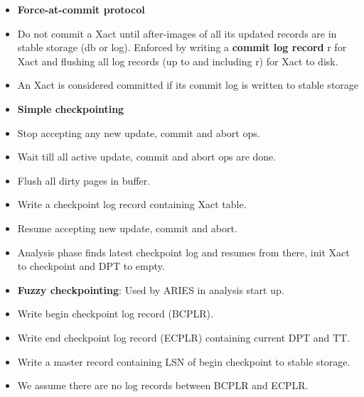\documentclass[8pt, landscape]{extarticle}
\begin{document}
\begin{multicols*}{4}
\begin{itemize}
  \item \textbf{Force-at-commit protocol}
  \item Do not commit a Xact until after-images of all its updated records are in stable storage (db or log). Enforced by writing a \textbf{commit log record} r for Xact and flushing all log records (up to and including r) for Xact to disk.
  \item An Xact is considered committed if its commit log is written to stable storage
  \item \textbf{Simple checkpointing}
  \item Stop accepting any new update, commit and abort ops.
  \item Wait till all active update, commit and abort ops are done.
  \item Flush all dirty pages in buffer.
  \item Write a checkpoint log record containing Xact table.
  \item Resume accepting new update, commit and abort.
  \item Analysis phase finds latest checkpoint log and resumes from there, init Xact to checkpoint and DPT to empty.
  \item \textbf{Fuzzy checkpointing}: Used by ARIES in analysis start up.
  \item Write begin checkpoint log record (BCPLR).
  \item Write end checkpoint log record (ECPLR) containing current DPT and TT.
  \item Write a master record containing LSN of begin checkpoint to stable storage.
  \item We assume there are no log records between BCPLR and ECPLR.
\end{itemize}


\end{multicols*}
\end{document}
